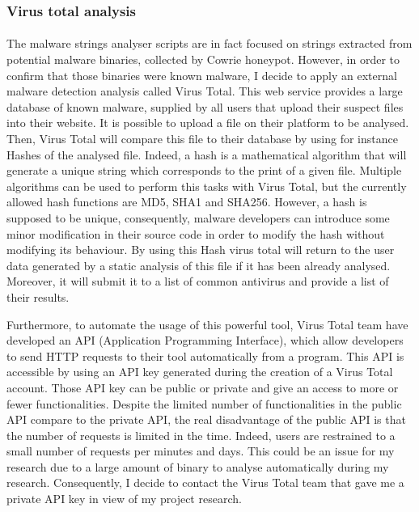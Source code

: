 \subsubsection{Virus total analysis} %

\paragraph{}

The malware strings analyser scripts are in fact focused on strings extracted from potential
malware binaries, collected by Cowrie honeypot. However, in order to confirm that those
binaries were known malware, I decide to apply an external malware detection analysis
called Virus Total. This web service provides a large database of known malware, supplied by 
all users that upload their suspect files into their website.
It is possible to upload a file on their platform to be analysed. Then, Virus Total
will compare this file to their database by using for instance Hashes of the analysed file.
Indeed, a hash is a mathematical algorithm that will generate a unique string which corresponds
to the print of a given file. Multiple algorithms can be used to perform this tasks with Virus
Total, but the currently allowed hash functions are MD5, SHA1 and SHA256. However, a hash is 
supposed to be unique, consequently, malware developers can introduce some minor modification
in their source code in order to modify the hash without modifying its behaviour.
By using this Hash virus total will return to the user data generated by a static analysis 
of this file if it has been already analysed. Moreover, it will submit it to a list of common
antivirus and provide a list of their results.

Furthermore, to automate the usage of this powerful tool, Virus Total team have developed
an API (Application Programming Interface), which allow developers to send HTTP requests to
their tool automatically from a program. This API is accessible by using an API key generated
during the creation of a Virus Total account. Those API key can be public or private and 
give an access to more or fewer functionalities. Despite the limited number of functionalities
in the public API compare to the private API, the real disadvantage of the public API is that
the number of requests is limited in the time. Indeed, users are restrained to a small
number of requests per minutes and days. This could be an issue for my research due to a large amount of binary to analyse automatically during my research. Consequently, I decide
to contact the Virus Total team that gave me a private API key in view of my project
research.

